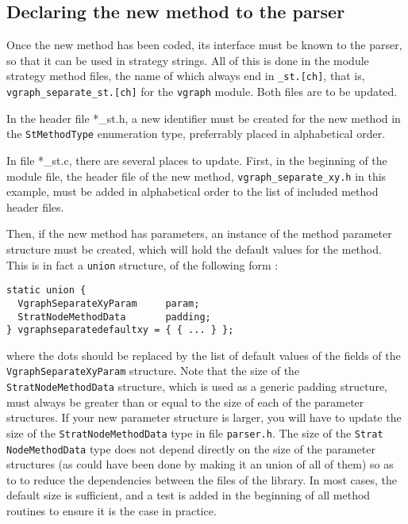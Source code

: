 \subsection{Declaring the new method to the parser}

Once the new method has been coded, its interface must be known to the
parser, so that it can be used in strategy strings. All of this is
done in the module strategy method files, the name of which always end
in {\tt \_st.[ch]}, that is, {\tt vgraph\_\lbt separate\_\lbt st.[ch]}
for the {\tt vgraph} module. Both files are to be updated.

In the header file {*\_st.h}, a new identifier must be created for the
new method in the {\tt St\lbt Method\lbt Type} enumeration type,
preferrably placed in alphabetical order.

In file {*\_st.c}, there are several places to update.
First, in the beginning of the module file, the header file of the new
method, {\tt vgraph\_\lbt separate\_\lbt xy\lbt .h} in this example,
must be added in alphabetical order to the list of included method
header files.

Then, if the new method has parameters, an instance of the method
parameter structure must be created, which will hold the default
values for the method. This is in fact a {\tt union} structure,
of the following form :
{\tt\begin{verbatim}
static union {
  VgraphSeparateXyParam     param;
  StratNodeMethodData       padding;
} vgraphseparatedefaultxy = { { ... } };
\end{verbatim}}
where the dots should be replaced by the list of default values of the
fields of the {\tt Vgraph\lbt Separate\lbt Xy\lbt Param} structure.
Note that the size of the {\tt Strat\lbt Node\lbt Method\lbt Data}
structure, which is used as a generic padding structure, must always
be greater than or equal to the size of each of the parameter
structures. If your new parameter structure is larger, you will have
to update the size of the {\tt Strat\lbt Node\lbt Method\lbt Data}
type in file {\tt parser.h}\enspace. The size of the {\tt Strat\lbt
Node\lbt Method\lbt Data} type does not depend directly on the size of
the parameter structures (as could have been done by making it an union
of all of them) so as to to reduce the dependencies between the files
of the library. In most cases, the default size is sufficient, and a
test is added in the beginning of all method routines to ensure it is
the case in practice.

